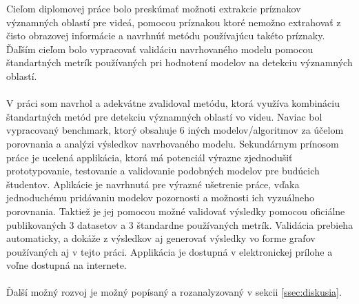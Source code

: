 Cieľom diplomovej práce bolo preskúmať možnoti extrakcie príznakov významných oblastí pre videá, pomocou príznakou ktoré nemožno extrahovať z čisto obrazovej informácie a navrhnúť metódu používajúcu takéto príznaky.
Ďaľším cieľom bolo vypracovať validáciu navrhovaného modelu pomocou štandartných metrík používaných pri hodnotení modelov na detekciu významných oblastí.
\\
\\
V práci som navrhol a adekvátne zvalidoval metódu, ktorá využíva kombináciu štandartných metód pre detekciu významných oblastí vo videu.
Naviac bol vypracovaný benchmark, ktorý obsahuje 6 iných modelov/algoritmov za účelom porovnania a analýzi výsledkov navrhovaného modelu.
Sekundárnym prínosom práce je ucelená applikácia, ktorá má potenciál výrazne zjednodušiť prototypovanie, testovanie a validovanie podobných modelov pre budúcich študentov.
Aplikácie je navrhnutá pre výrazné ušetrenie práce, vďaka jednoduchému pridávaniu modelov pozornosti a možnosti ich vyzuálneho porovnania.
Taktiež je jej pomocou možné validovať výsledky pomocou oficiálne publikovaných 3 datasetov a 3 štandardne používaných metrík.
Validácia prebieha automaticky, a dokáže z výsledkov aj generovať výsledky vo forme grafov používaných aj v tejto práci.
Applikácia je dostupná v elektronickej prílohe a voľne dostupná na internete. 
\\
\\
Ďalší možný rozvoj je možný popísaný a rozanalyzovaný v sekcii \ref{ssec:diskusia}.

